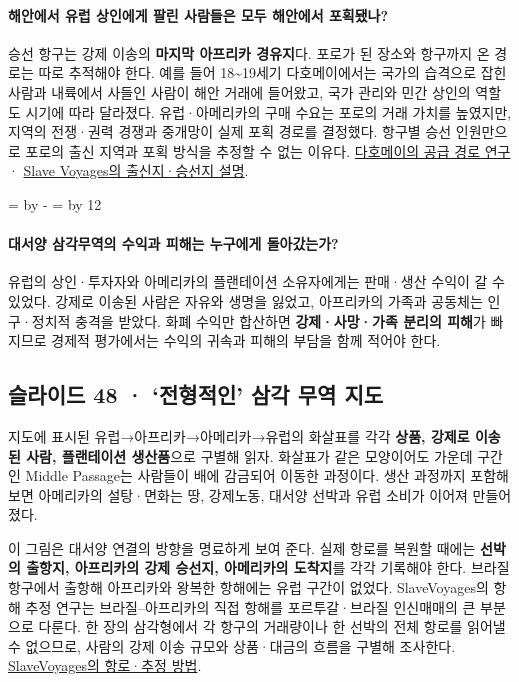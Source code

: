\documentclass[10pt,a4paper]{article}
\newcommand{\ReserveQuestionSpace}{%
  \par\begingroup
  \dimen0=\pagegoal \advance\dimen0 by -\pagetotal
  \dimen2=\baselineskip \multiply\dimen2 by 12
  \ifdim\dimen0<\dimen2 \newpage\fi
  \endgroup}
\begin{document}
\paragraph{해안에서 유럽 상인에게 팔린 사람들은 모두 해안에서 포획됐나?}
승선 항구는 강제 이송의 \textbf{마지막 아프리카 경유지}다. 포로가 된 장소와 항구까지 온 경로는 따로 추적해야 한다. 예를 들어 18\textasciitilde{}19세기 다호메이에서는 국가의 습격으로 잡힌 사람과 내륙에서 사들인 사람이 해안 거래에 들어왔고, 국가 관리와 민간 상인의 역할도 시기에 따라 달라졌다. 유럽·아메리카의 구매 수요는 포로의 거래 가치를 높였지만, 지역의 전쟁·권력 경쟁과 중개망이 실제 포획 경로를 결정했다. 항구별 승선 인원만으로 포로의 출신 지역과 포획 방식을 추정할 수 없는 이유다. \href{https://www.cambridge.org/core/journals/journal-of-african-history/article/abs/slaveraiders-and-middlemen-monopolists-and-freetraders-the-supply-of-slaves-for-the-atlantic-trade-in-dahomey-c-17151850/25FD3A6506F945524A260237736CA0BB}{다호메이의 공급 경로 연구} · \href{https://legacy.slavevoyages.org/blog/brief-overview-trans-atlantic-slave-trade}{Slave Voyages의 출신지·승선지 설명}.\par

\ReserveQuestionSpace
\paragraph{대서양 삼각무역의 수익과 피해는 누구에게 돌아갔는가?}
유럽의 상인·투자자와 아메리카의 플랜테이션 소유자에게는 판매·생산 수익이 갈 수 있었다. 강제로 이송된 사람은 자유와 생명을 잃었고, 아프리카의 가족과 공동체는 인구·정치적 충격을 받았다. 화폐 수익만 합산하면 \textbf{강제·사망·가족 분리의 피해}가 빠지므로 경제적 평가에서는 수익의 귀속과 피해의 부담을 함께 적어야 한다.\par

\subsection{슬라이드 48 · ‘전형적인’ 삼각 무역 지도}
지도에 표시된 유럽→아프리카→아메리카→유럽의 화살표를 각각 \textbf{상품, 강제로 이송된 사람, 플랜테이션 생산품}으로 구별해 읽자. 화살표가 같은 모양이어도 가운데 구간인 Middle Passage는 사람들이 배에 감금되어 이동한 과정이다. 생산 과정까지 포함해 보면 아메리카의 설탕·면화는 땅, 강제노동, 대서양 선박과 유럽 소비가 이어져 만들어졌다.\par

이 그림은 대서양 연결의 방향을 명료하게 보여 준다. 실제 항로를 복원할 때에는 \textbf{선박의 출항지, 아프리카의 강제 승선지, 아메리카의 도착지}를 각각 기록해야 한다. 브라질 항구에서 출항해 아프리카와 왕복한 항해에는 유럽 구간이 없었다. SlaveVoyages의 항해 추정 연구는 브라질–아프리카의 직접 항해를 포르투갈·브라질 인신매매의 큰 부분으로 다룬다. 한 장의 삼각형에서 각 항구의 거래량이나 한 선박의 전체 항로를 읽어낼 수 없으므로, 사람의 강제 이송 규모와 상품·대금의 흐름을 구별해 조사한다. \href{https://www.slavevoyages.org/documents/download/2010estimates-method.pdf}{SlaveVoyages의 항로·추정 방법}.\par
\end{document}
